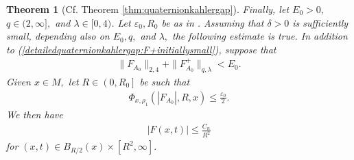 \documentclass[12pt]{amsart}
\newcommand{\LB}{\left[}
\newcommand{\RB}{\right]}
\renewcommand{\1}{{\mathbf 1}}
\newcommand{\eps}{{\varepsilon}}
\newtheorem{thm}{Theorem}[section]
\theoremstyle{others}
\numberwithin{equation}{section}
\begin{document}
\begin{thm}[Cf. Theorem \ref{thm:quaternionkahlergap}]
  Finally, let $E_0 > 0,$ $q \in (2, \infty],$ and \(\lambda \in [0, 4)\). Let $\varepsilon_0, R_0$ be as in \cite[Theorem 6.2]{oliveirawaldron}. Assuming that $\delta > 0$ is sufficiently small, depending also on $E_0,q,$ and $\lambda,$ the following estimate is true. %
  In addition to (\ref{detailedquaternionkahlergap:F+initiallysmall}), suppose that
  \begin{align}\label{detailedquaternionkahlergap:hypotheses1}
      \|F_{A_0}\|_{2,4} + \| F^+_{A_0} \|_{q,\lambda} < E_0.
  \end{align}
 Given $x \in M,$ let $R \in \left( 0, R_0 \RB$ be such that
  \begin{align}\label{detailedquaternionkahlergap:hypotheses2}
      \Phi_{x, \rho_1} \left( |F_{A_0}|, R, x \right) \leq \frac{\eps_0}{2}.
  \end{align}
  We then have
  \begin{align}\label{detailedquaternionkahlergap:regularityscale}
      |F(x,t)| \leq \frac{C_n}{R^2}
  \end{align}
  for $(x,t) \in B_{R/2}(x) \times \LB R^2, \infty \RB.$
\end{thm}
\end{document}
